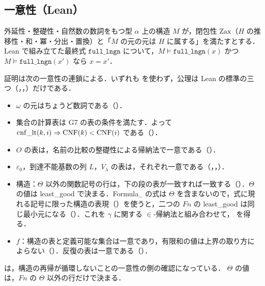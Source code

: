 \subsection{一意性（Lean）}\label{sec:uniq}
\begin{theorem}\label{thm:uniq}
外延性・整礎性・自然数の数詞をもつ型 $\alpha$ 上の構造 $M$ が，閉包性 $\mathrm{Zax}$（$H$ の推移性・和・冪・分出・置換）と「$M$ の元の元は $H$ に属する」を満たすとする．Lean で組み立てた最終式 $\mathtt{full\_lngn}$ について，$M\models\mathtt{full\_lngn}(x)$ かつ $M\models\mathtt{full\_lngn}(x')$ なら $x=x'$．
\end{theorem}
証明は次の一意性の連鎖による．いずれも  を使わず，公理は Lean の標準の三つ（，，）だけである．
\begin{itemize}
\item $\omega$ の元はちょうど数詞である（）．
\item 集合の計算表は G7 の表の条件を満たす．よって $\mathrm{cnf\_lt}(k,i)\Rightarrow\mathrm{CNF}(k)<\mathrm{CNF}(i)$ である（）．
\item $O$ の表は，名前の比較の整礎性による帰納法で一意である（）．
\item $\varepsilon_0$，到達不能基数の列 $L$，$V_\lambda$ の表は，それぞれ一意である（，，）．
\item 構造：$\Theta$ 以外の関数記号の行は，下の段の表が一致すれば一致する（）．$\Theta$ の値は least\_good で決まる．Formula$_-$ の式は $\Theta$ を含まないので，式に現れる記号に限った構造の表現（）を使うと，二つの $Fn$ の least\_good は同じ最小元になる（）．これを $\gamma$ に関する $\in$-帰納法と組み合わせて， を得る．
\item $f$：構造の表と定義可能な集合は一意であり，有限和の値は上界の取り方によらない（）．反復の表は一意である（）．
\end{itemize}

 は，構造の再帰が循環しないことの一意性の側の確認になっている．
$\Theta$ の値は，$Fn$ の $\Theta$ 以外の行だけで決まる．

